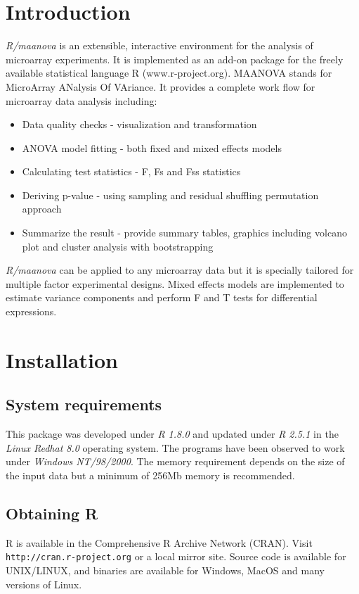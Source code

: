 \section{Introduction}
{\em R/maanova} is an extensible, 
interactive environment for the analysis of microarray experiments. 
It is implemented as an add-on
package for the freely available statistical language R (www.r-project.org).
MAANOVA stands for MicroArray ANalysis Of VAriance. It provides a complete 
work flow for microarray data analysis including:
\begin{itemize}
\item Data quality checks - visualization and transformation
\item ANOVA model fitting - both fixed and mixed effects models
\item Calculating test statistics - F, Fs and Fss  statistics
\item Deriving p-value - using sampling and residual shuffling permutation approach
\item Summarize the result - provide summary tables, graphics including volcano plot and cluster analysis with bootstrapping
\end{itemize}

{\em R/maanova} can be applied to any microarray data but it is
specially tailored for multiple factor experimental designs.
Mixed effects models are implemented to estimate variance components 
and perform F and T tests for differential expressions.
\newpage
\section{Installation}
\subsection{System requirements}
This package was developed under {\em R 1.8.0} and updated under {\em R 2.5.1} in the {\em Linux Redhat 8.0} operating system. The programs have been 
observed to work under {\em Windows NT/98/2000}. The memory requirement
depends on the size of the input data but a minimum of 256Mb memory
is recommended. 
\subsection{Obtaining R}
R is available in the Comprehensive R Archive Network (CRAN).
Visit \\{\tt http://cran.r-project.org} or a local mirror site.
Source code is available for UNIX/LINUX, and binaries are 
available for Windows, MacOS and many versions of Linux.  
